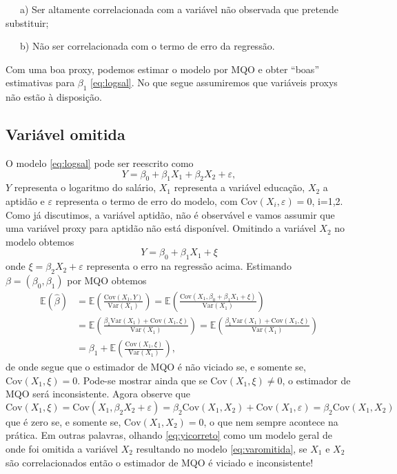 \documentclass[
]{book}
\theoremstyle{definition}
\theoremstyle{definition}
\theoremstyle{definition}
\theoremstyle{remark}
\begin{document}
~~~a) Ser altamente correlacionada com a variável não observada que pretende substituir;

~~~b) Não ser correlacionada com o termo de erro da regressão.

Com uma boa proxy, podemos estimar o modelo por MQO e obter ``boas'' estimativas para \(\beta_1\) \eqref{eq:logsal}. No que segue assumiremos que variáveis proxys não estão à disposição.

\hypertarget{variuxe1vel-omitida}{%
\subsection{Variável omitida}\label{variuxe1vel-omitida}}

O modelo \eqref{eq:logsal} pode ser reescrito como
\begin{equation}
 Y=\beta_0+\beta_1X_1+\beta_2X_2+\varepsilon,
 \label{eq:yicorreto}
\end{equation}
\(Y\) representa o logaritmo do salário, \(X_{1}\) representa a variável educação, \(X_2\) a aptidão e \(\varepsilon\) representa o termo de erro do modelo, com \(\mbox{Cov}(X_i,\varepsilon)=0\), i=1,2. Como já discutimos, a variável aptidão, não é observável e vamos assumir que uma variável proxy para aptidão não está disponível. Omitindo a variável \(X_2\) no modelo obtemos
\begin{equation}
Y=\beta_0+\beta_1X_1+\xi
\label{eq:varomitida}
\end{equation}
onde \(\xi=\beta_2X_2+\varepsilon\) representa o erro na regressão acima. Estimando \({\beta}=(\beta_0,\beta_1)\) por MQO obtemos
\begin{align*}
\mathbb{E}(\hat{\beta})&=\mathbb{E}\left(\frac{\mbox{Cov}(X_1,Y)}{\mbox{Var}(X_1)}\right)=\mathbb{E}\left(\frac{\mbox{Cov}(X_1,\beta_0+\beta_1X_1+\xi)}{\mbox{Var}(X_1)}\right)\\
&=\mathbb{E}\left(\frac{\beta_1\mbox{Var}(X_1)+\mbox{Cov}(X_1,\xi)}{\mbox{Var}(X_1)}\right)=\mathbb{E}\left(\frac{\beta_1\mbox{Var}(X_1)+\mbox{Cov}(X_1,\xi)}{\mbox{Var}(X_1)}\right)\\
&=\beta_1+\mathbb{E}\left(\frac{\mbox{Cov}(X_1,\xi)}{\mbox{Var}(X_1)}\right),
\end{align*}
de onde segue que o estimador de MQO é não viciado se, e somente se, \(\mbox{Cov}(X_1,\xi)=0\). Pode-se mostrar ainda que se \(\mbox{Cov}(X_1,\xi)\neq0\), o estimador de MQO será inconsistente. Agora observe que
\[\mbox{Cov}(X_1,\xi)=\mbox{Cov}(X_1,\beta_2X_2+\varepsilon)=\beta_2\mbox{Cov}(X_1,X_2)+\mbox{Cov}(X_1,\varepsilon)=\beta_2\mbox{Cov}(X_1,X_2)\]
que é zero se, e somente se, \(\mbox{Cov}(X_1,X_2)=0\), o que nem sempre acontece na prática. Em outras palavras, olhando \eqref{eq:yicorreto} como um modelo geral de onde foi omitida a variável \(X_2\) resultando no modelo \eqref{eq:varomitida}, se \(X_1\) e \(X_2\) são correlacionados então o estimador de MQO é viciado e inconsistente!
\end{document}
